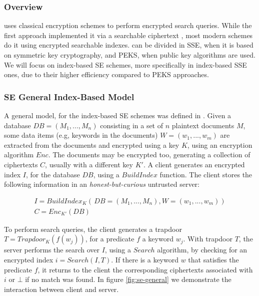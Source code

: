 \subsubsection{Overview}
 uses classical encryption schemes to perform encrypted search queries. While the first approach implemented it via a searchable ciphertext \autocite{Song2000-hu}, most modern schemes do it using encrypted searchable indexes.  can be divided in \gls{SSE}, when it is based on symmetric key cryptography, and \gls{PEKS}, when public key algorithms are used. We will focus on index-based \gls{SE} schemes, more specifically in index-based \gls{SSE} ones, due to their higher efficiency compared to \gls{PEKS} approaches.



\subsubsection{\gls{SE} General Index-Based Model}

A general model, for the index-based \gls{SE} schemes was defined in \autocite{Bosch2014-eb}. Given a database $DB=(M_{1},...,M_{n})$ consisting in a set of $n$ plaintext documents $M$, some data items (e.g, keywords in the documents) $W=(w_{1},...,w_{m})$ are extracted from the documents and encrypted using a key $K$, using an encryption algorithm $Enc$. The documents may be encrypted too, generating a collection of ciphertexts $C$, usually with a different key $K'$. A client generates an encrypted index $I$, for the database $DB$, using a $BuildIndex$ function. The client stores the following information in an \emph{honest-but-curious} untrusted server:

\begin{equation}
    \begin{array}{l}
    I = BuildIndex_{K}(\, DB=(M_{1},...,M_{n}), W=(w_{1},...,w_{m}))\\
    C = Enc_{K'}(DB) 
    \end{array}
\end{equation}

To perform search queries, the client generates a trapdoor $T=Trapdoor_{K}(f(w_{j}))$, for a predicate $f$ a keyword $w_{j}$. With trapdoor $T$, the server performs the search over $I$, using a $Search$ algorithm, by checking for an encrypted index $i = Search(I,T)$. If there is a keyword $w$ that satisfies the predicate $f$, it returns to the client the corresponding ciphertexts associated with $i$ or $\bot$ if no match was found. In figure \ref{fig:se-general} we demonstrate the interaction between client and server.

